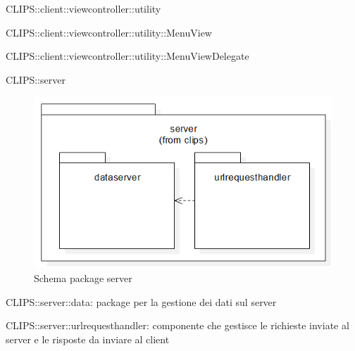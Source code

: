 \begin{componente}{CLIPS::client::viewcontroller::utility}
\begin{compClassi}
\begin{classe}{CLIPS::client::viewcontroller::utility::MenuView}
\begin{classeRelazioni}
\end{classeRelazioni}
\end{classe}\begin{classe}{CLIPS::client::viewcontroller::utility::MenuViewDelegate}
\begin{classeRelazioni}
\end{classeRelazioni}
\end{classe}\end{compClassi}
\end{componente}
\begin{componente}{CLIPS::server}
\begin{figure}[h!]
\centering
\includegraphics[scale=0.4]{img/package/png/server.png}
\caption{Schema package server}
 \end{figure}
\begin{compPackageContenuti}
\item CLIPS::server::data: package per la gestione dei dati sul server
\item CLIPS::server::urlrequesthandler: componente che gestisce le richieste inviate al server e le risposte da inviare al client
\end{compPackageContenuti}
\end{componente}
